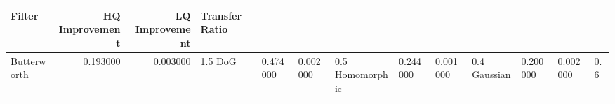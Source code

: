 \begin{tabular}{lrrl}
\toprule
Filter & HQ Improvement & LQ Improvement & Transfer Ratio \\
\midrule
Butterworth & 0.193000 & 0.003000 & 1.5%
DoG & 0.474000 & 0.002000 & 0.5%
Homomorphic & 0.244000 & 0.001000 & 0.4%
Gaussian & 0.200000 & 0.002000 & 0.6%
\bottomrule
\end{tabular}
